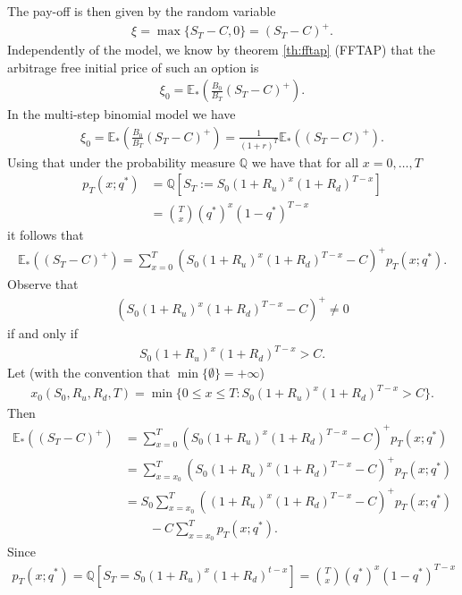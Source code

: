 \documentclass{article}
\theoremstyle{definition}
\numberwithin{equation}{section}
\begin{document}
The pay-off is then given by the random variable
\begin{align}
    \xi = \max\{ S_T - C, 0\} = (S_T - C)^+.
\end{align}
Independently of the model, we know by theorem \ref{th:fftap} (FFTAP) that the arbitrage free initial price of such an option is 
\begin{align}
    \xi_0 = \mathbb{E}_*\left( \frac{B_0}{B_T}(S_T - C)^+\right). 
\end{align}
In the multi-step binomial model we have
\begin{align}
    \xi_0 = \mathbb{E}_* \left( \frac{B_0}{B_T}(S_T - C)^+ \right) = \frac{1}{(1+r)^T} \mathbb{E}_* \left( (S_T-C)^+\right). 
\end{align}
Using that under the probability measure $\mathbb{Q}$ we have that for all $x = 0, \ldots, T$
\begin{align}
    p_T(x; q^*) &= \mathbb{Q}\left[ S_T := S_0(1+ R_u)^x(1+R_d)^{T-x}\right]\\
    &= \binom{T}{x}( q^* )^x(1-q^*)^{T-x}
\end{align}
it follows that 
\begin{align}
    \mathbb{E}_* \left( (S_T - C)^+ \right) = \sum_{x=0}^T \left( S_0(1+R_u)^x(1+R_d)^{T-x} - C \right)^+ p_T(x; q^*).
\end{align}
Observe that 
\begin{align}
    \left( S_0(1+R_u)^x(1+R_d)^{T-x} - C \right)^+ \neq 0
\end{align}
if and only if 
\begin{align}
     S_0(1+R_u)^x(1+R_d)^{T-x} > C. 
\end{align}
Let (with the convention that $\min\{ \emptyset \} = + \infty$)
\begin{align}
    x_0(S_0, R_u, R_d, T) = \min\{ 0 \leq x \leq T : S_0(1 + R_u)^x(1+R_d)^{T-x} > C\}. 
\end{align}
Then 
\begin{align}
    \mathbb{E}_*\left( (S_T - C)^+\right) &= \sum_{x=0}^T \left( S_0(1+R_u)^x(1 + R_d)^{T-x}  - C \right)^+ p_T(x; q^*)\\
    &= \sum_{x=x_0}^T \left( S_0(1+R_u)^x(1 + R_d)^{T-x}  - C \right)^+ p_T(x; q^*)\\
    &= S_0 \sum_{x=x_0}^T \left((1+R_u)^x(1 + R_d)^{T-x}  - C \right)^+ p_T(x; q^*)
    \\ &\qquad 
    - C \sum_{x=x_0}^T p_T (x; q^*). 
\end{align}
Since 
\begin{align}
    p_T(x; q^*) = \mathbb{Q} \left[ S_T = S_0(1 + R_u)^x(1+R_d)^{t-x} \right] = \binom{T}{x}(q^*)^x(1-q^*)^{T-x}
\end{align}
\end{document}
